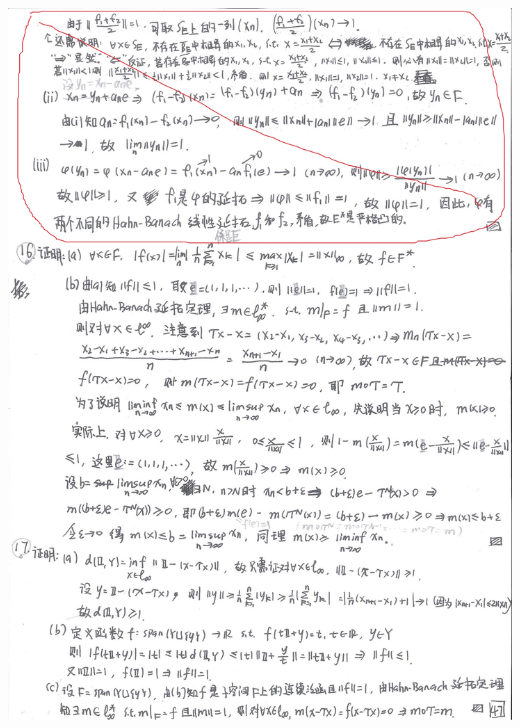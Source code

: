 \documentclass[a4paper,8pt]{ctexart}\textwidth 140mm \textheight 216mm
\newcommand{\8}{\infty}
\begin{document}
\includegraphics[scale=0.8]{9_16.jpg}
\clearpage
\end{document}
